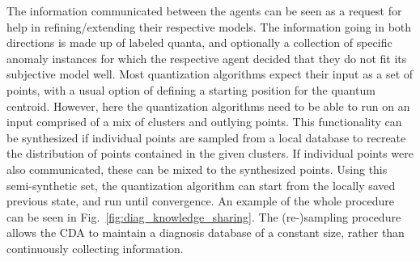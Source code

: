 			The information communicated between the agents can be seen as a request for help in refining/extending their respective models.
			The information going in both directions is made up of labeled quanta, and optionally a collection of specific anomaly instances for which the respective agent decided that they do not fit its subjective model well.			
			Most quantization algorithms expect their input as a set of points, with a usual option of defining a starting position for the quantum centroid.
			However, here the quantization algorithms need to be able to run on an input comprised of a mix of clusters and outlying points.
			This functionality can be synthesized if individual points are sampled from a local database to recreate the distribution of points contained in the given clusters.
			If individual points were also communicated, these can be mixed to the synthesized points.
			Using this semi-synthetic set, the quantization algorithm can start from the locally saved previous state, and run until convergence.
			An example of the whole procedure can be seen in Fig.~\ref{fig:diag_knowledge_sharing}.			
			The (re-)sampling procedure allows the \ac{CDA} to maintain a diagnosis database of a constant size, rather than continuously collecting information.
			
